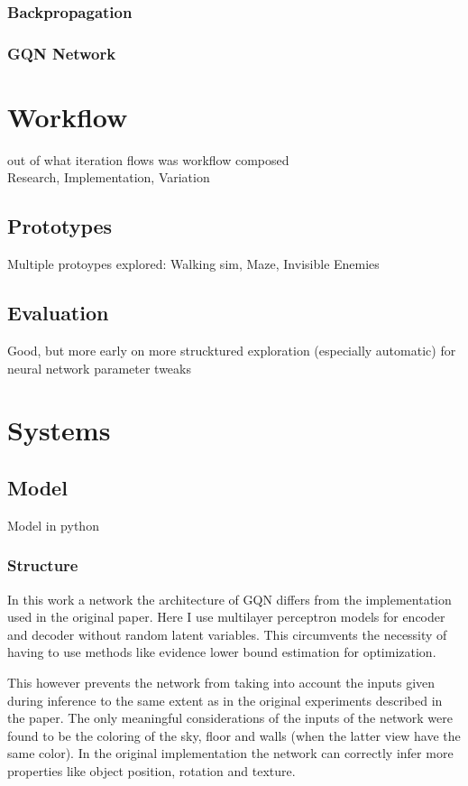\documentclass[a4paper, twoside, 10pt]{report}
\begin{document}
\subsection{Backpropagation}
\subsection{GQN Network}
\cite{gqn}



\chapter{Workflow}
out of what iteration flows was workflow composed \\
Research, Implementation, Variation

\section{Prototypes}
Multiple protoypes explored:
Walking sim,
Maze,
Invisible Enemies

\section{Evaluation}
Good, but more early on more strucktured exploration (especially automatic) for neural network parameter tweaks



\chapter{Systems}
\section{Model}
Model in python

\subsection{Structure}
In this work a network the architecture of GQN differs from the implementation used in the original paper. Here I use multilayer perceptron models for encoder and decoder without random latent variables. This circumvents the necessity of having to use methods like evidence lower bound estimation for optimization.

This however prevents the network from taking into account the inputs given during inference to the same extent as in the original experiments described in the paper. The only meaningful considerations of the inputs of the network were found to be the coloring of the sky, floor and walls (when the latter view have the same color). In the original implementation the network can correctly infer more properties like object position, rotation and texture.
\end{document}
